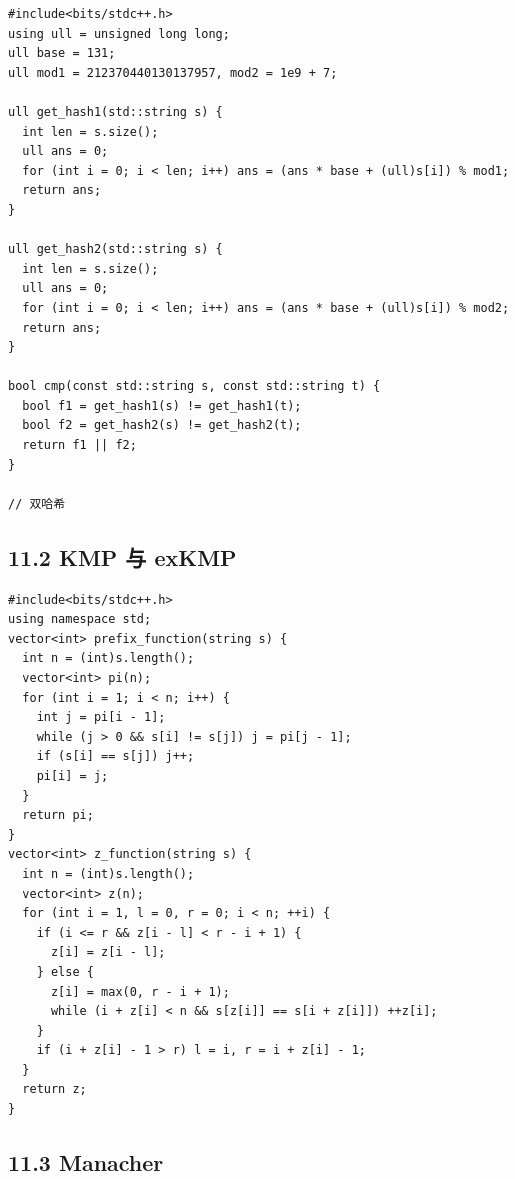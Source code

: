 \documentclass[UTF8,a4paper,11pt]{ctexart}
\begin{document}
\begin{Verbatim}[fontsize=\small,frame=single,breaklines=true,breakanywhere=true]
#include<bits/stdc++.h>
using ull = unsigned long long;
ull base = 131;
ull mod1 = 212370440130137957, mod2 = 1e9 + 7;

ull get_hash1(std::string s) {
  int len = s.size();
  ull ans = 0;
  for (int i = 0; i < len; i++) ans = (ans * base + (ull)s[i]) % mod1;
  return ans;
}

ull get_hash2(std::string s) {
  int len = s.size();
  ull ans = 0;
  for (int i = 0; i < len; i++) ans = (ans * base + (ull)s[i]) % mod2;
  return ans;
}

bool cmp(const std::string s, const std::string t) {
  bool f1 = get_hash1(s) != get_hash1(t);
  bool f2 = get_hash2(s) != get_hash2(t);
  return f1 || f2;
}

// 双哈希
\end{Verbatim}

\subsection*{11.2 KMP 与 exKMP}

\begin{Verbatim}[fontsize=\small,frame=single,breaklines=true,breakanywhere=true]
#include<bits/stdc++.h>
using namespace std;
vector<int> prefix_function(string s) {
  int n = (int)s.length();
  vector<int> pi(n);
  for (int i = 1; i < n; i++) {
    int j = pi[i - 1];
    while (j > 0 && s[i] != s[j]) j = pi[j - 1];
    if (s[i] == s[j]) j++;
    pi[i] = j;
  }
  return pi;
}
vector<int> z_function(string s) {
  int n = (int)s.length();
  vector<int> z(n);
  for (int i = 1, l = 0, r = 0; i < n; ++i) {
    if (i <= r && z[i - l] < r - i + 1) {
      z[i] = z[i - l];
    } else {
      z[i] = max(0, r - i + 1);
      while (i + z[i] < n && s[z[i]] == s[i + z[i]]) ++z[i];
    }
    if (i + z[i] - 1 > r) l = i, r = i + z[i] - 1;
  }
  return z;
}
\end{Verbatim}

\subsection*{11.3 Manacher}
\end{document}
